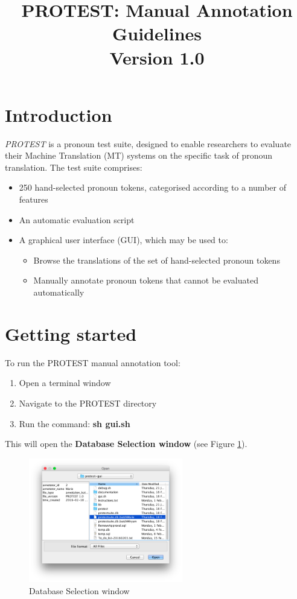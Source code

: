 \documentclass[11pt]{article} %
\title{PROTEST: Manual Annotation Guidelines\\Version 1.0}
\begin{document}
\maketitle

\section{Introduction}
\textit{PROTEST} is a pronoun test suite, designed to enable researchers to evaluate their Machine Translation (MT) systems on the specific task of pronoun translation. The test suite comprises:
\begin{itemize}
  \item 250 hand-selected pronoun tokens, categorised according to a number of features
  \item An automatic evaluation script
  \item A graphical user interface (GUI), which may be used to:
  \begin{itemize}
    \item Browse the translations of the set of hand-selected pronoun tokens
    \item Manually annotate pronoun tokens that cannot be evaluated automatically
  \end{itemize}
\end{itemize}

\section{Getting started}
To run the PROTEST manual annotation tool:
\begin{enumerate}
  \item Open a terminal window
  \item Navigate to the PROTEST directory
  \item Run the command: \textbf{sh gui.sh}
\end{enumerate}

\noindent
This will open the \textbf{Database Selection window} (see Figure \ref{fig:DatabaseWindow}).

\begin{figure}[h!]
    \centering
    \includegraphics[width=0.60\textwidth]{DatabaseSelectionWindow.png}
    \caption{Database Selection window}
    \label{fig:DatabaseWindow}
\end{figure}
\end{document}
